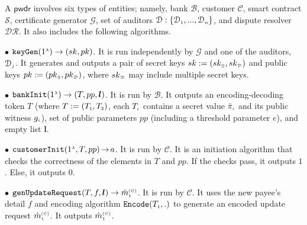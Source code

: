 \begin{definition}\label{def-a::sytax} A $\mathsf{pwdr}$    involves six   types of entities; namely,  bank $\mathcal{B}$, customer $\mathcal{C}$,  smart contract $\mathcal{S}$,  certificate generator $\mathcal{G}$,   set of auditors $\mathcal{D}:\{\mathcal{D}_{\scriptscriptstyle 1},..., \mathcal{D}_{\scriptscriptstyle n}\}$, and  dispute resolver $\mathcal{DR}$. It also includes the following    algorithms.  

%

\vs

\item [$\bullet$]  $\mathtt{keyGen}(1^{\scriptscriptstyle \lambda})\rightarrow (sk,pk)$. 
It is run independently by  $\mathcal{G}$ and one of the auditors, $\mathcal{D}_{\scriptscriptstyle j}$. 
%
It  generates and outputs a pair of secret keys $sk:=(sk_{\scriptscriptstyle\mathcal {G}}, sk_{\scriptscriptstyle\mathcal {D}})$ and public keys $pk:=(pk_{\scriptscriptstyle\mathcal {G}},pk_{\scriptscriptstyle\mathcal {D}})$, where $sk_{\scriptscriptstyle\mathcal {D}}$ may include multiple secret keys. 
%

\vs

\item[$\bullet$] $\mathtt{bankInit}(1^{\scriptscriptstyle \lambda})\rightarrow (T, pp, \bm{l})$. It is run by  $\mathcal{B}$. 
%
It  outputs an encoding-decoding token $T$ (where  $T:=(T_{\scriptscriptstyle 1},T_{\scriptscriptstyle 2})$,  each $T_{\scriptscriptstyle i}$  contains  a secret value $\ddot\pi_{\scriptscriptstyle i}$ and its  public witness $g_{\scriptscriptstyle i}$),  set of  public parameters  $pp$  (including a threshold parameter $e$),  and    empty list $\bm{l}$.
%
\vs

\item[$\bullet$] $\mathtt{customerInit} (1^{\scriptscriptstyle \lambda}, T, pp)\hspace{-.5mm}\rightarrow\hspace{-.5mm} a$. It is run by  $\mathcal{C}$. It is an  initiation algorithm that checks the correctness of the elements in $T$ and $pp$. If the checks pass, it outputs $1$. Else, it outputs $0$. 
%

\vs

\item [$\bullet$] $\mathtt{genUpdateRequest}(T, f, {\bm l})\rightarrow \hat m^{\scriptscriptstyle\mathcal{(C)}}_{\scriptscriptstyle 1}$.  It is run by $\mathcal{C}$. 
%
It uses the new payee's detail $f$ and encoding algorithm $\mathtt{Encode}(T_{\scriptscriptstyle 1},.)$ to generate an encoded update request $\hat  m^{\scriptscriptstyle\mathcal{(C)}}_{\scriptscriptstyle 1}$.  It outputs  $\hat  m^{\scriptscriptstyle\mathcal{(C)}}_{\scriptscriptstyle 1}$.
%


\end{definition}
